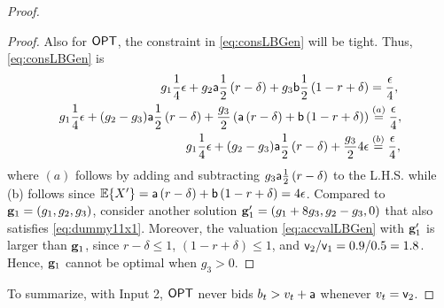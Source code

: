 \begin{proof}
\begin{proof}
Also for $\mathsf{OPT}$, the constraint in \eqref{eq:consLBGen} will be tight. Thus, \eqref{eq:consLBGen} is 
\begin{align}\nonumber
g_1 \frac{1}{4} \epsilon + g_2 {\mathsf{a}} \frac{1}{2} \left(r-\delta\right)  + g_3 {\mathsf{b}} \frac{1}{2} \left(1-r+\delta\right) &= \frac{\epsilon}{4}, \\ \nonumber
 g_1 \frac{1}{4} \epsilon + (g_2-g_3) {\mathsf{a}} \frac{1}{2} \left(r-\delta\right) + \frac{g_3}{2} \left({\mathsf{a}}  \left(r-\delta\right)  + {\mathsf{b}}  \left(1-r+\delta\right)\right) &\stackrel{(a)}= \frac{\epsilon}{4}, \\\label{eq:dummy11x1}
g_1 \frac{1}{4} \epsilon + (g_2-g_3) {\mathsf{a}} \frac{1}{2} \left(r-\delta\right) + \frac{g_3}{2} 4 \epsilon &\stackrel{(b)}= \frac{\epsilon}{4},
\end{align}
where $(a)$ follows by adding and subtracting $g_3 {\mathsf{a}} \frac{1}{2} \left(r-\delta\right)$ to the L.H.S. while (b) follows since ${\mathbb{E}}\{X'\} = {\mathsf{a}}  \left(r-\delta\right) + {\mathsf{b}}  \left(1-r+\delta\right) = 4 \epsilon$.
Compared to ${\mathbf{g}}_1 = (g_1, g_2, g_3)$, consider another solution ${\mathbf{g}}_1' = (g_1+8g_3, g_2-g_3, 0)$ that also satisfies \eqref{eq:dummy11x1}. Moreover,
the valuation  \eqref{eq:accvalLBGen} with ${\mathbf{g}}_1'$ is larger than ${\mathbf{g}}_1$, since $r-\delta\le 1$, $(1-r+\delta) \le 1$, and ${\mathsf{v}}_2/{\mathsf{v}}_1=0.9/0.5=1.8$.
Hence, ${\mathbf{g}}_1$ cannot be optimal when $g_3>0$.
\end{proof}
To summarize, with Input 2, $\mathsf{OPT}$ never bids $b_t >  v_t+{\mathsf{a}}$ whenever $v_t={\mathsf{v}}_2$.



\end{proof}
